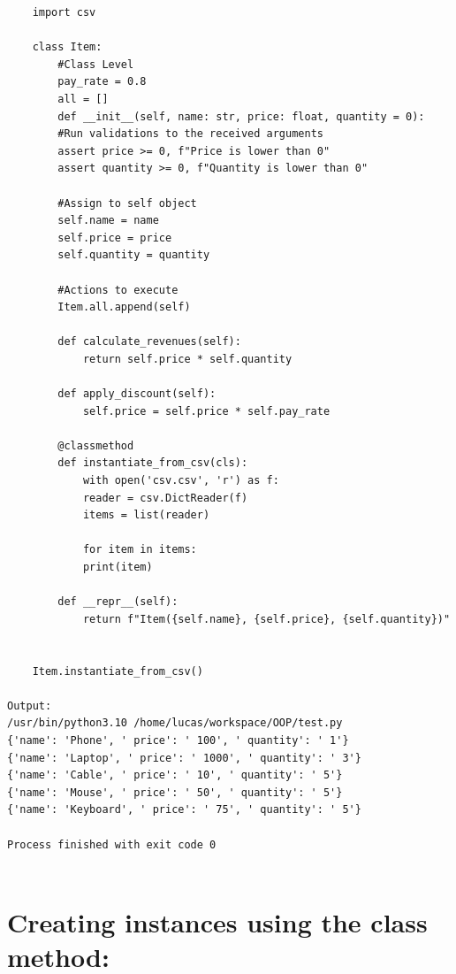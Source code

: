 \documentclass{article}
\begin{document}
\begin{lstlisting}
	import csv
	
	class Item:
		#Class Level
		pay_rate = 0.8
		all = []
		def __init__(self, name: str, price: float, quantity = 0):
		#Run validations to the received arguments
		assert price >= 0, f"Price is lower than 0"
		assert quantity >= 0, f"Quantity is lower than 0"
		
		#Assign to self object
		self.name = name
		self.price = price
		self.quantity = quantity
		
		#Actions to execute
		Item.all.append(self)
		
		def calculate_revenues(self):
			return self.price * self.quantity
		
		def apply_discount(self):
			self.price = self.price * self.pay_rate
		
		@classmethod
		def instantiate_from_csv(cls):
			with open('csv.csv', 'r') as f:
			reader = csv.DictReader(f)
			items = list(reader)
			
			for item in items:
			print(item)
			
		def __repr__(self):
			return f"Item({self.name}, {self.price}, {self.quantity})"
			
	
	Item.instantiate_from_csv()
	
Output:
/usr/bin/python3.10 /home/lucas/workspace/OOP/test.py 
{'name': 'Phone', ' price': ' 100', ' quantity': ' 1'}
{'name': 'Laptop', ' price': ' 1000', ' quantity': ' 3'}
{'name': 'Cable', ' price': ' 10', ' quantity': ' 5'}
{'name': 'Mouse', ' price': ' 50', ' quantity': ' 5'}
{'name': 'Keyboard', ' price': ' 75', ' quantity': ' 5'}

Process finished with exit code 0
	
\end{lstlisting}

\section{Creating instances using the class method:}
\end{document}
